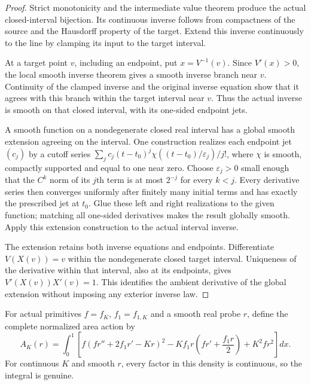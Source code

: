 \documentclass[11pt]{article}
\begin{document}
\begin{proof}
Strict monotonicity and the intermediate value theorem produce the actual
closed-interval bijection. Its continuous inverse follows from compactness
of the source and the Hausdorff property of the target. Extend this inverse
continuously to the line by clamping its input to the target interval.

At a target point $v$, including an endpoint, put $x=V^{-1}(v)$.
Since $V'(x)>0$, the local smooth inverse theorem gives a smooth inverse
branch near $v$. Continuity of the clamped inverse and the original inverse
equation show that it agrees with this branch within the target interval
near $v$. Thus the actual inverse is smooth on that closed interval,
with its one-sided endpoint jets.

A smooth function on a nondegenerate closed real interval has a global
smooth extension agreeing on the interval. One construction realizes each
endpoint jet $(c_j)$ by a cutoff series
$\sum_j c_j(t-t_0)^j\chi((t-t_0)/\varepsilon_j)/j!$,
where $\chi$ is smooth, compactly supported and equal to one near zero.
Choose $\varepsilon_j>0$ small enough that the $C^k$ norm of its $j$th term
is at most $2^{-j}$ for every $k<j$. Every derivative series then converges
uniformly after finitely many initial terms and has exactly the prescribed
jet at $t_0$. Glue these left and right realizations to the given function;
matching all one-sided derivatives makes the result globally smooth.
Apply this extension construction to the actual interval inverse.

The extension retains both inverse equations and endpoints. Differentiate
$V(X(v))=v$ within the nondegenerate closed target interval. Uniqueness of
the derivative within that interval, also at its endpoints, gives
$V'(X(v))X'(v)=1$. This identifies the ambient derivative of the global
extension without imposing any exterior inverse law.
\end{proof}

For actual primitives $f=f_K$, $f_1=f_{1,K}$ and a smooth real probe $r$, define
the complete normalized area action by
\begin{equation}\label{eq:complete-area-action}
 A_K(r)=\int_0^1
 \left[
 f(fr''+2f_1r'-Kr)^2
 -Kf_1r\left(fr'+\frac{f_1r}{2}\right)
 +K^2fr^2
 \right]dx .
\end{equation}
For continuous $K$ and smooth $r$, every factor in this density is continuous,
so the integral is genuine.
\end{document}
